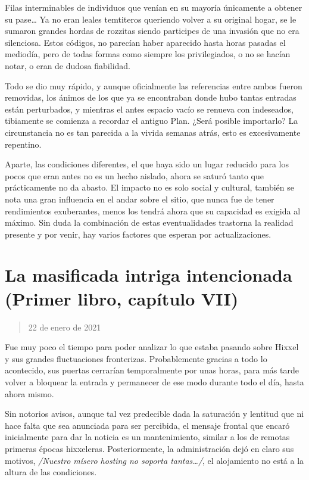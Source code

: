 \documentclass[
]{book}
\begin{document}
Filas interminables de individuos que venían en su mayoría únicamente a obtener su pase\ldots{} Ya no eran leales temtiteros queriendo volver a su original hogar, se le sumaron grandes hordas de rozzitas siendo participes de una invasión que no era silenciosa. Estos códigos, no parecían haber aparecido hasta horas pasadas el mediodía, pero de todas formas como siempre los privilegiados, o no se hacían notar, o eran de dudosa fiabilidad.

Todo se dio muy rápido, y aunque oficialmente las referencias entre ambos fueron removidas, los ánimos de los que ya se encontraban donde hubo tantas entradas están perturbados, y mientras el antes espacio vacío se renueva con indeseados, tibiamente se comienza a recordar el antiguo Plan. ¿Será posible importarlo? La circunstancia no es tan parecida a la vivida semanas atrás, esto es excesivamente repentino.

Aparte, las condiciones diferentes, el que haya sido un lugar reducido para los pocos que eran antes no es un hecho aislado, ahora se saturó tanto que prácticamente no da abasto. El impacto no es solo social y cultural, también se nota una gran influencia en el andar sobre el sitio, que nunca fue de tener rendimientos exuberantes, menos los tendrá ahora que su capacidad es exigida al máximo. Sin duda la combinación de estas eventualidades trastorna la realidad presente y por venir, hay varios factores que esperan por actualizaciones.

\hypertarget{la-masificada-intriga-intencionada-primer-libro-capuxedtulo-vii}{%
\section{La masificada intriga intencionada (Primer libro, capítulo VII)}\label{la-masificada-intriga-intencionada-primer-libro-capuxedtulo-vii}}

\begin{quote}
22 de enero de 2021
\end{quote}

Fue muy poco el tiempo para poder analizar lo que estaba pasando sobre Hixxel y sus grandes fluctuaciones fronterizas. Probablemente gracias a todo lo acontecido, sus puertas cerrarían temporalmente por unas horas, para más tarde volver a bloquear la entrada y permanecer de ese modo durante todo el día, hasta ahora mismo.

Sin notorios avisos, aunque tal vez predecible dada la saturación y lentitud que ni hace falta que sea anunciada para ser percibida, el mensaje frontal que encaró inicialmente para dar la noticia es un mantenimiento, similar a los de remotas primeras épocas hixxeleras. Posteriormente, la administración dejó en claro sus motivos, \emph{/Nuestro mísero hosting no soporta tantas\ldots/}, el alojamiento no está a la altura de las condiciones.
\end{document}
